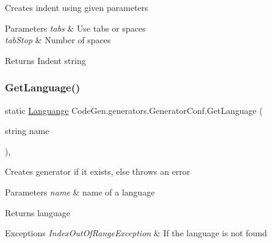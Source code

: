Creates indent using given parameters 


\begin{DoxyParams}{Parameters}
{\em tabs} & Use tabs or spaces\\
\hline
{\em tab\+Stop} & Number of spaces\\
\hline
\end{DoxyParams}
\begin{DoxyReturn}{Returns}
Indent string
\end{DoxyReturn}
\mbox{\label{classCodeGen_1_1generators_1_1GeneratorConf_a358bcc4be771d981ac1aa4c451b48383}} 
\subsubsection{\texorpdfstring{Get\+Language()}{GetLanguage()}}
{\footnotesize\ttfamily static \mbox{\hyperlink{structCodeGen_1_1generators_1_1Languange}{Languange}} Code\+Gen.\+generators.\+Generator\+Conf.\+Get\+Language (\begin{DoxyParamCaption}\item[{string}]{name }\end{DoxyParamCaption})\hspace{0.3cm}{\ttfamily [inline]}, {\ttfamily [static]}}



Creates generator if it exists, else throws an error 


\begin{DoxyParams}{Parameters}
{\em name} & name of a language\\
\hline
\end{DoxyParams}
\begin{DoxyReturn}{Returns}
language
\end{DoxyReturn}

\begin{DoxyExceptions}{Exceptions}
{\em Index\+Out\+Of\+Range\+Exception} & If the language is not found\\
\hline
\end{DoxyExceptions}
\mbox{\label{classCodeGen_1_1generators_1_1GeneratorConf_a7b70aa3e67ba52dfbd1a271da20fc74e}} 
